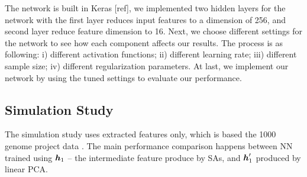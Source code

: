 \documentclass[acmtog, authorversion]{acmart}
\begin{document}
The network is built in Keras [ref], we implemented two hidden layers for the network with the first layer reduces input features to a dimension of 256, and second layer reduce feature dimension to 16. Next, we choose different settings for the network to see how each component affects our results. The process is as following: i) different activation functions; ii) different learning rate; iii) different sample size; iv) different regularization parameters. At last, we implement our network by using the tuned settings to evaluate our performance. 

\subsection{Simulation Study}
The simulation study uses extracted features only, which is based the 1000 genome project data \cite{Data:1K_Genome}. The main performance comparison happens between NN trained using $\boldsymbol{h}_1$ -- the intermediate feature produce by SAs, and $\boldsymbol{h}_1^\prime$ produced by linear PCA.
\end{document}
